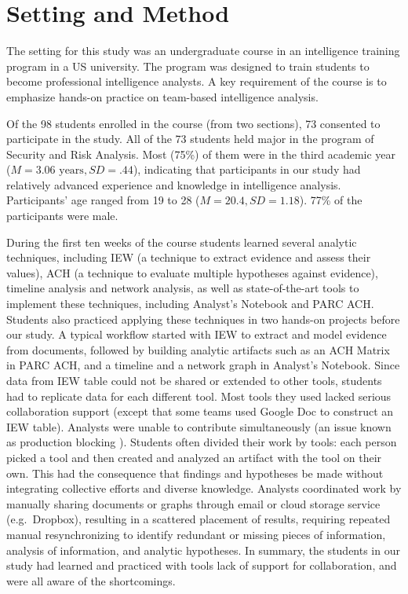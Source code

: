 \section{Setting and Method}\label{classroom-study-settings}

The setting for this study was an undergraduate course in an intelligence
training program in a US university. The program was designed to train students
to become professional intelligence analysts. A key requirement of the course is
to emphasize hands-on practice on team-based intelligence analysis.

Of the 98 students enrolled in the course (from
two sections), 73 consented to participate in the study. All of the 73 students
held major in the program of Security and Risk Analysis. Most (75\%) of them
were in the third academic year ($M=3.06 \text{ years}, SD=.44$), indicating that participants in
our study had relatively advanced experience and knowledge in intelligence
analysis. Participants' age ranged from 19 to 28 ($M=20.4, SD=1.18$). 77\% of the
participants were male.


During the first ten weeks of the course
students learned several analytic techniques, including IEW (a technique
to extract evidence and assess their values), ACH (a technique to evaluate
multiple hypotheses against evidence), timeline analysis and network
analysis, as well as state-of-the-art tools to implement these
techniques, including Analyst's Notebook and PARC ACH. Students also practiced applying these
techniques in two hands-on projects before our study. A typical workflow started with IEW to
extract and model evidence from documents, followed by building analytic
artifacts such as an ACH Matrix in PARC ACH, and a timeline and a network
graph in Analyst's Notebook. Since data from IEW table could not be
shared or extended to other tools, students had to replicate data for
each different tool. Most tools they used lacked serious collaboration
support (except that some teams used Google Doc to construct an IEW
table). Analysts were unable to contribute simultaneously (an issue
known as production blocking \cite{Diehl1987a}). Students often divided their work by tools: each person picked a tool and then created and analyzed an artifact
with the tool on their own. This had the consequence that findings and
hypotheses be made without integrating collective efforts and diverse
knowledge. Analysts coordinated work by manually sharing documents
or graphs through email or cloud storage service (e.g.~Dropbox),
resulting in a scattered placement of results, requiring repeated manual
resynchronizing to identify redundant or missing pieces of information,
analysis of information, and analytic hypotheses. In summary, the students in our study had learned and practiced with tools lack of support for collaboration, and were all aware of the shortcomings.

